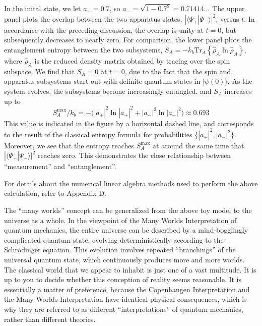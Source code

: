 \documentclass[pra,12pt]{revtex4-2}
\begin{document}
In the inital state, we let $a_+ = 0.7$, so $a_- = \sqrt{1-0.7^2} =
0.71414\dots$ The upper panel plots the overlap between the two
apparatus states, $|\langle\Psi_+|\Psi_-\rangle|^2$, versus $t$.  In
accordance with the preceding discussion, the overlap is unity at $t =
0$, but subsequently decreases to nearly zero.  For comparison, the
lower panel plots the entanglement entropy between the two subsystems,
$S_A = -k_b \mathrm{Tr}_A\left\{\hat{\rho}_A\ln\hat{\rho}_A\right\}$,
where $\hat{\rho}_A$ is the reduced density matrix obtained by tracing
over the spin subspace.  We find that $S_A = 0$ at $t=0$, due to the
fact that the spin and apparatus subsystems start out with definite
quantum states in $|\psi(0)\rangle$.  As the system evolves, the
subsystems become increasingly entangled, and $S_A$ increases up to
\begin{equation}
  S_A^{\mathrm{max}}/k_b = - \Big( |a_+|^2 \ln|a_+|^2 + |a_-|^2\ln|a_-|^2 \Big) \approx 0.693
\end{equation}
This value is indicated in the figure by a horizontal dashed line, and
corresponds to the result of the classical entropy formula for
probabilities $\{|a_+|^2,|a_-|^2\}$.  Moreover, we see that the
entropy reaches $S_A^{\mathrm{max}}$ at around the same time that
$|\langle\Psi_+|\Psi_-\rangle|^2$ reaches zero.  This demonstrates the
close relationship between ``measurement'' and ``entanglement''.

For details about the numerical linear algebra methods used to perform
the above calculation, refer to Appendix D.

The ``many worlds'' concept can be generalized from the above toy
model to the universe as a whole.  In the viewpoint of the Many Worlds
Interpretation of quantum mechanics, the entire universe can be
described by a mind-bogglingly complicated quantum state, evolving
deterministically according to the Schr\"odinger equation.  This
evolution involves repeated ``branchings'' of the universal quantum
state, which continuously produces more and more worlds.  The
classical world that we appear to inhabit is just one of a vast
multitude.  It is up to you to decide whether this conception of
reality seems reasonable.  It is essentially a matter of preference,
because the Copenhangen Interpretation and the Many Worlds
Interpretation have identical physical consequences, which is why they
are referred to as different ``interpretations'' of quantum mechanics,
rather than different theories.
\end{document}
